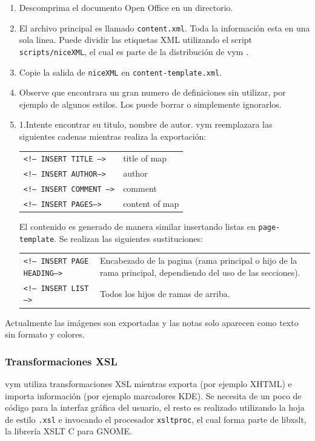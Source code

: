 \documentclass{article}
\newcommand{\vym}{{\sc vym }}
\begin{document}
\begin{appendix}
\begin{enumerate}
	\item Descomprima el documento Open Office en un directorio.

	\item El archivo principal es llamado {\tt content.xml}. Toda la informaci\'on esta en una sola linea. Puede dividir las etiquetas XML utilizando el script {\tt	scripts/niceXML}, el cual es parte de la distribuci\'on de \vym.

	\item Copie la salida de  {\tt niceXML} en {\tt content-template.xml}.

	\item Observe que encontrara un gran numero de definiciones sin utilizar, por ejemplo de algunos estilos. Los puede borrar o simplemente ignorarlos.

	\item 1.Intente encontrar su titulo, nombre de autor. \vym reemplazara las siguientes cadenas mientras realiza la exportaci\'on:
	\begin{center}
	\begin{tabular}{lp{4cm}}
		{\tt <!-- INSERT TITLE -->}		& title of map \\
		{\tt <!-- INSERT AUTHOR-->	}	& author \\
		{\tt <!-- INSERT COMMENT -->}	& comment \\
		{\tt <!-- INSERT PAGES-->}		& content of map \\
	\end{tabular}
	\end{center}
	El contenido es generado de manera similar insertando listas en {\tt page-template}. Se realizan las siguientes sustituciones:
	\begin{center}
	\begin{tabular}{lp{7cm}}
		{\tt <!-- INSERT PAGE HEADING-->}		& Encabezado de la pagina (rama principal o          							hijo de la rama principal, dependiendo 							del uso de las secciones). \\
		{\tt <!-- INSERT LIST -->	}	& Todos los hijos de ramas de arriba. \\
	\end{tabular}
	\end{center}
\end{enumerate}
Actualmente las im\'agenes son exportadas y las notas solo aparecen como texto sin formato y colores.


\subsubsection*{Transformaciones XSL}
\vym utiliza transformaciones XSL mientras exporta (por ejemplo XHTML) e importa informaci\'on (por ejemplo marcadores KDE). Se necesita de un poco de c\'odigo para la interfaz gr\'afica del usuario, el resto es realizado utilizando la hoja de estilo {\tt .xsl} e invocando el procesador {\tt xsltproc}, el cual forma parte de libxslt, la librer\'ia XSLT C para GNOME.

\end{appendix}
\end{document}
